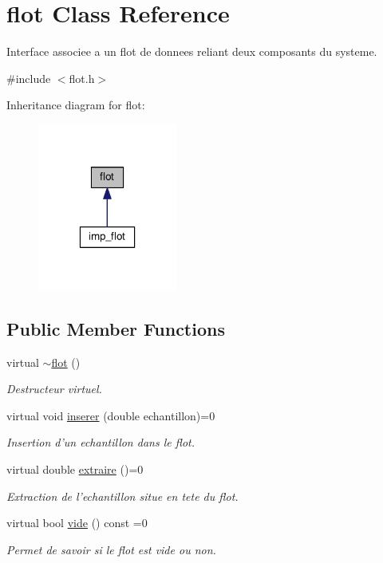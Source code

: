 \hypertarget{classflot}{\section{flot Class Reference}
\label{classflot}
}


Interface associee a un flot de donnees reliant deux composants du systeme.  




{\ttfamily \#include $<$flot.\-h$>$}



Inheritance diagram for flot\-:
\nopagebreak
\begin{figure}[H]
\begin{center}
\leavevmode
\includegraphics[width=130pt]{classflot__inherit__graph}
\end{center}
\end{figure}
\subsection*{Public Member Functions}
\begin{DoxyCompactItemize}
\item 
virtual \hyperlink{classflot_ae73ea3f5f51ae0994305f85fba4f80da}{$\sim$flot} ()
\begin{DoxyCompactList}\small\item\em Destructeur virtuel. \end{DoxyCompactList}\item 
virtual void \hyperlink{classflot_a324d696c55f5b0f0b036f8069ffe7911}{inserer} (double echantillon)=0
\begin{DoxyCompactList}\small\item\em Insertion d'un echantillon dans le flot. \end{DoxyCompactList}\item 
virtual double \hyperlink{classflot_a84b9830b712c4c96f052b04883c4fa80}{extraire} ()=0
\begin{DoxyCompactList}\small\item\em Extraction de l'echantillon situe en tete du flot. \end{DoxyCompactList}\item 
virtual bool \hyperlink{classflot_aa1dc8b1beedc87daedd4fc0f5354cbb6}{vide} () const =0
\begin{DoxyCompactList}\small\item\em Permet de savoir si le flot est vide ou non. \end{DoxyCompactList}\end{DoxyCompactItemize}


